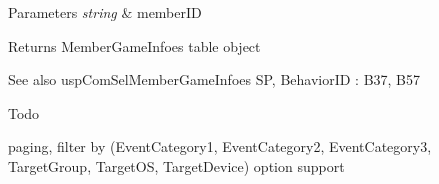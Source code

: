 \begin{DoxyParams}{Parameters}
{\em string} & member\+ID \\
\hline
\end{DoxyParams}
\begin{DoxyReturn}{Returns}
Member\+Game\+Infoes table object 
\end{DoxyReturn}
\begin{DoxySeeAlso}{See also}
usp\+Com\+Sel\+Member\+Game\+Infoes SP, Behavior\+ID \+: B37, B57 
\end{DoxySeeAlso}
\begin{DoxyRefDesc}{Todo}
\item[\hyperlink{a00001__todo000003}{Todo}]paging, filter by (Event\+Category1, Event\+Category2, Event\+Category3, Target\+Group, Target\+OS, Target\+Device) option support \end{DoxyRefDesc}
